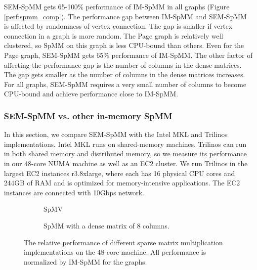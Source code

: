 %		

SEM-SpMM gets 65-100\% performance of IM-SpMM in all graphs (Figure
\ref{perf:spmm_comp}). The performance gap between IM-SpMM and SEM-SpMM
is affected by randomness of vertex connection. The gap is smaller if
vertex connection in a graph is more random. The Page graph is relatively
well clustered, so SpMM on this graph is less CPU-bound than others.
Even for the Page graph, SEM-SpMM gets 65\% performance of IM-SpMM.
The other factor of affecting the performance gap is the number of columns
in the dense matrices. The gap gets smaller as the number of columns in
the dense matrices increases. For all graphs, SEM-SpMM requires a very small
number of columns to become CPU-bound and achieve performance close to IM-SpMM.

\subsubsection{SEM-SpMM vs. other in-memory SpMM}
In this section, we compare SEM-SpMM with the Intel MKL and Trilinos
implementations. Intel MKL runs on shared-memory machines. Trilinos can run in
both shared memory and distributed memory, so we measure its performance in
our 48-core NUMA machine as well as an EC2 cluster. We run Trilinos in the largest
EC2 instances r3.8xlarge, where each has 16 physical CPU cores and 244GB of RAM
and is optimized for memory-intensive applications. The EC2 instances are
connected with 10Gbps network.

\begin{figure}
	\footnotesize
	\centering
	\begin{subfigure}[b]{0.5\textwidth}
		\centering
		
		\vspace{-10pt}
		\caption{SpMV}
		\label{perf:spmv}
	\end{subfigure}
	\begin{subfigure}[b]{0.5\textwidth}
		\centering
		
		\vspace{-10pt}
		\caption{SpMM with a dense matrix of 8 columns.}
		\label{perf:spmm8}
	\end{subfigure}
	\vspace{3pt}
	\caption{The relative performance of different sparse matrix multiplication
		implementations on the 48-core machine. All performance is normalized by
	IM-SpMM for the graphs.}
	\label{perf:spmm}
\end{figure}

